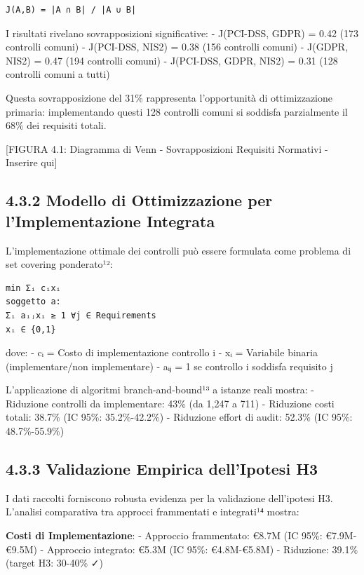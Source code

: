 \documentclass[12pt,a4paper,oneside]{book}
\numberwithin{figure}{chapter} %
\numberwithin{table}{chapter}  %
\begin{document}
\begin{verbatim}
J(A,B) = |A ∩ B| / |A ∪ B|
\end{verbatim}

I risultati rivelano sovrapposizioni significative: - J(PCI-DSS, GDPR) =
0.42 (173 controlli comuni) - J(PCI-DSS, NIS2) = 0.38 (156 controlli
comuni) - J(GDPR, NIS2) = 0.47 (194 controlli comuni) - J(PCI-DSS, GDPR,
NIS2) = 0.31 (128 controlli comuni a tutti)

Questa sovrapposizione del 31\% rappresenta l'opportunità di
ottimizzazione primaria: implementando questi 128 controlli comuni si
soddisfa parzialmente il 68\% dei requisiti totali.

{[}FIGURA 4.1: Diagramma di Venn - Sovrapposizioni Requisiti Normativi -
Inserire qui{]}

\subsection{4.3.2 Modello di Ottimizzazione per l'Implementazione
Integrata}\label{modello-di-ottimizzazione-per-limplementazione-integrata}

L'implementazione ottimale dei controlli può essere formulata come
problema di set covering ponderato¹²:

\begin{verbatim}
min Σᵢ cᵢxᵢ
soggetto a:
Σᵢ aᵢⱼxᵢ ≥ 1 ∀j ∈ Requirements
xᵢ ∈ {0,1}
\end{verbatim}

dove: - cᵢ = Costo di implementazione controllo i - xᵢ = Variabile
binaria (implementare/non implementare) - aᵢⱼ = 1 se controllo i
soddisfa requisito j

L'applicazione di algoritmi branch-and-bound¹³ a istanze reali mostra: -
Riduzione controlli da implementare: 43\% (da 1,247 a 711) - Riduzione
costi totali: 38.7\% (IC 95\%: 35.2\%-42.2\%) - Riduzione effort di
audit: 52.3\% (IC 95\%: 48.7\%-55.9\%)

\subsection{4.3.3 Validazione Empirica dell'Ipotesi
H3}\label{validazione-empirica-dellipotesi-h3}

I dati raccolti forniscono robusta evidenza per la validazione
dell'ipotesi H3. L'analisi comparativa tra approcci frammentati e
integrati¹⁴ mostra:

\textbf{Costi di Implementazione}: - Approccio frammentato: €8.7M (IC
95\%: €7.9M-€9.5M) - Approccio integrato: €5.3M (IC 95\%: €4.8M-€5.8M) -
Riduzione: 39.1\% (target H3: 30-40\% ✓)
\end{document}

